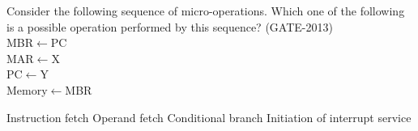 \begin{questyle}
  \question  Consider the following sequence of micro-operations. Which one of the following
            is a possible operation performed by this sequence?  (GATE-2013)
            \\ \qquad MBR\(\leftarrow\)PC
            \\ \qquad MAR\(\leftarrow\)X
            \\ \qquad PC\(\leftarrow\)Y
            \\ \qquad Memory\(\leftarrow\)MBR \\
  \begin{oneparchoices}
    \choice         Instruction fetch
    \choice         Operand fetch
    \choice         Conditional branch
    \CorrectChoice  Initiation of interrupt service
  \end{oneparchoices}
\end{questyle}

